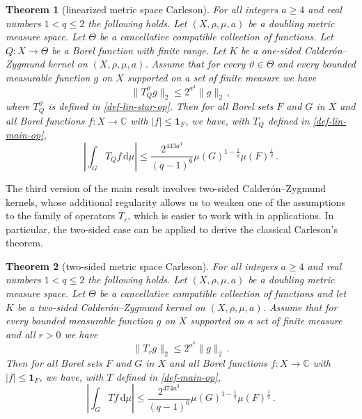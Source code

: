 \documentclass[12pt]{amsart}
\theoremstyle{definition}
\theoremstyle{plain}
\newtheorem{theorem}{Theorem}[subsection]
\def\C{\mathbb{C}}
\newcommand{\tQ}{{Q}}
\newcommand{\mfa}{{\vartheta}}
\newcommand{\Mf}{{\Theta}}
\begin{document}
\begin{theorem}[linearized metric space Carleson]
\label{linearized-metric-Carleson}
    For all integers $a \ge 4$ and real numbers $1<q\le 2$ the following holds.
    Let $(X,\rho,\mu,a)$ be a doubling metric measure space. Let $\Mf$ be a
    cancellative compatible collection of functions.
    Let $\tQ:X\to \Mf$ be a Borel function with finite range.
    Let $K$ be a one-sided Calder\'on--Zygmund kernel on $(X,\rho,\mu,a)$. Assume that for every $\mfa\in \Mf$ and every bounded measurable function $g$ on $X$ supported on a set of finite measure we have
    \begin{equation}\label{linnontanbound}
        \|T_{\tQ}^\mfa g\|_{2} \leq 2^{a^3} \|g\|_2\,,
    \end{equation}
    where $T_{\tQ}^\mfa$ is defined in \eqref{def-lin-star-op}.
    Then for all Borel sets $F$ and $G$ in $X$ and all Borel functions $f:X\to \C$ with
    $|f|\le \mathbf{1}_F$, we have, with $T_\tQ$ defined in \eqref{def-lin-main-op},
    \begin{equation}
        \label{linresweak}
        \left|\int_{G} T_\tQ f \, \mathrm{d}\mu\right| \le \frac{2^{443a^3}}{(q-1)^6} \mu(G)^{1-\frac{1}{q}} \mu(F)^{\frac{1}{q}}\, .
    \end{equation}
\end{theorem}

The third version of the main result involves two-sided Calder\'on--Zygmund kernels, whose additional regularity allows us to weaken one of the assumptions to the family of operators $T_r$, which is easier to work with in applications.
In particular, the two-sided case can be applied to derive the classical Carleson's theorem.

\begin{theorem}[two-sided metric space Carleson]
    \label{two-sided-metric-space-Carleson}
        For all  integers $a \ge  4$ and real numbers $1<q\le 2$ the following holds.
        Let $(X,\rho,\mu,a)$ be a doubling metric measure space. Let $\Mf$ be a
        cancellative compatible collection of functions and let $K$ be a two-sided Calder\'on--Zygmund kernel on $(X,\rho,\mu,a)$. Assume that for every bounded measurable function $g$ on $X$ supported on a set of finite measure and all $r>0$ we have
      \begin{equation}\label{two-sided-Hr-bound-assumption}
            \|T_r g\|_{2} \leq 2^{a^3} \|g\|_2\,.
        \end{equation}
        Then for all Borel sets $F$ and $G$ in $X$ and
        all Borel functions $f:X\to \C$ with
        $|f|\le \mathbf{1}_F$, we have, with $T$ defined in \eqref{def-main-op},
      \begin{equation}
        \label{two-sided-resweak}
            \left|\int_{G} T f \, \mathrm{d}\mu\right| \leq \frac{2^{474a^3}}{(q-1)^6} \mu(G)^{1-\frac{1}{q}} \mu(F)^{\frac{1}{q}}\, .
        \end{equation}
\end{theorem}
\end{document}
